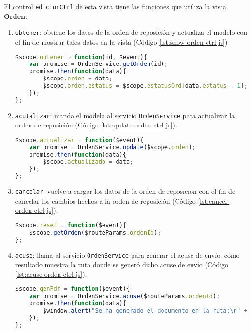 El control \texttt{edicionCtrl} de esta vista tiene las funciones que utiliza la vista \textbf{Orden}:
\begin{enumerate}
	\item \texttt{obtener}: obtiene los datos de la orden de reposición y actualiza el modelo con el fin de mostrar tales datos en la vista (Código \ref{lst:show-orden-ctrl-js})
\begin{lstlisting}[language=Javascript, caption={Función del controlador para llenar los datos de la vista de orden de reposición.}, captionpos=b, label={lst:show-orden-ctrl-js}]
$scope.obtener = function(id, $event){
	var promise = OrdenService.getOrden(id);
	promise.then(function(data){
		$scope.orden = data;
		$scope.orden.estatus = $scope.estatusOrd[data.estatus - 1];
	});
};
\end{lstlisting}

	\item \texttt{acutalizar}: manda el modelo al servicio \texttt{OrdenService} para actualizar la orden de reposición (Código \ref{lst:update-orden-ctrl-js}).
\begin{lstlisting}[language=Javascript, caption={Función del controlador de \textit{AngularJS} para actualizar una orden de reposición.}, captionpos=b, label={lst:update-orden-ctrl-js}]
$scope.actualizar = function($event){
	var promise = OrdenService.update($scope.orden);
	promise.then(function(data){
		$scope.actualizado = data;
	});
};
\end{lstlisting}

	\item \texttt{cancelar}: vuelve a cargar los datos de la orden de reposición con el fin de cancelar los cambios hechos a la orden de reposición (Código \ref{lst:cancel-orden-ctrl-js}).
\begin{lstlisting}[language=Javascript, caption={Función del controlador de \textit{AngularJS} para cancelar los cambios en una orden de reposición}, captionpos=b, label={lst:cancel-orden-ctrl-js}]
$scope.reset = function($event){
	$scope.getOrden($routeParams.ordenId);
};
\end{lstlisting}

	\item \texttt{acuse}: llama al servicio \texttt{OrdenService} para generar el acuse de envío, como resultado muestra la ruta donde se generó dicho acuse de envío (Código \ref{lst:acuse-orden-ctrl-js}).
\begin{lstlisting}[language=Javascript, caption={Función del controlador de \textit{AngularJS} para generar el acuse de envío de la orden de reposición.}, captionpos=b, label={lst:acuse-orden-ctrl-js}]
$scope.genPdf = function($event){
	var promise = OrdenService.acuse($routeParams.ordenId);
	promise.then(function(data){
		$window.alert("Se ha generado el documento en la ruta:\n" + data);
	});
};
\end{lstlisting}

\end{enumerate}

